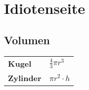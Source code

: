 \section{Idiotenseite}





\subsection{Volumen}
\begin{tabular}{>{\bfseries}ll}
Kugel & $\frac{4}{3}\pi r^3$ \\
Zylinder & $\pi r^2 \cdot h$
\end{tabular}
